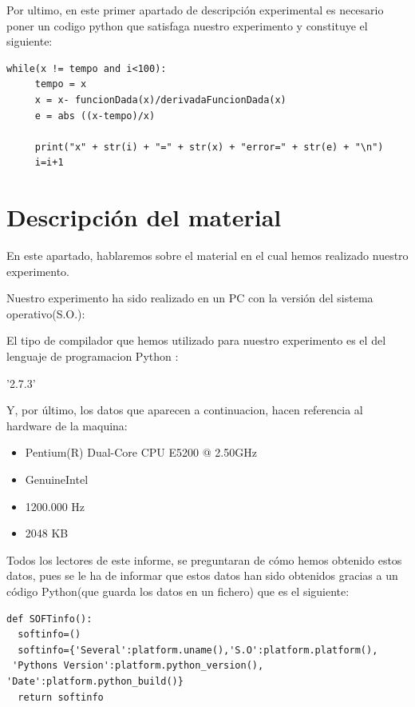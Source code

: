 Por ultimo, en este primer apartado de descripción experimental es necesario poner un codigo python que satisfaga nuestro experimento y constituye el siguiente:

\begin{verbatim}
while(x != tempo and i<100):
     tempo = x
     x = x- funcionDada(x)/derivadaFuncionDada(x)
     e = abs ((x-tempo)/x)

     print("x" + str(i) + "=" + str(x) + "error=" + str(e) + "\n")
     i=i+1
\end{verbatim}



\section{Descripción del material}
En este apartado, hablaremos sobre el material en el cual hemos realizado nuestro experimento.

Nuestro experimento ha sido realizado en un PC con la versión del sistema operativo(S.O.):\\

\vspace{0.5cm}


El tipo de compilador que hemos utilizado para nuestro experimento es el del lenguaje de programacion Python :\\ 

\centerline{'2.7.3'}
\vspace{0.5cm}

Y, por último, los datos que aparecen a continuacion, hacen referencia al hardware de la maquina:\\
\begin{itemize}
\item Pentium(R) Dual-Core  CPU      E5200  @ 2.50GHz
\item GenuineIntel
\item 1200.000 Hz 
\item 2048 KB
\end{itemize}

Todos los lectores de este informe, se preguntaran de cómo hemos obtenido estos datos, pues se le ha de informar que estos datos han sido obtenidos gracias a un código Python(que guarda los datos en un fichero) que es el siguiente:

\begin{verbatim}
def SOFTinfo():
  softinfo=()
  softinfo={'Several':platform.uname(),'S.O':platform.platform(),
 'Pythons Version':platform.python_version(), 'Date':platform.python_build()}
  return softinfo
\end{verbatim}



